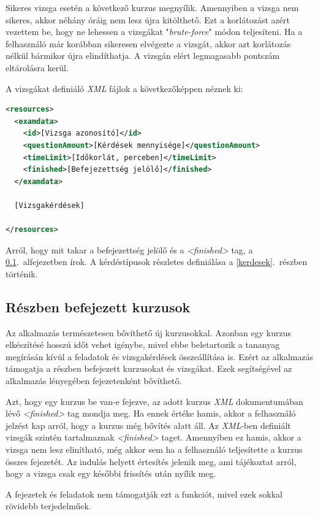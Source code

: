 \documentclass[12pt,a4paper]{article}
\newcommand{\xml}{\textit{XML}\xspace}
\begin{document}
	Sikeres vizsga esetén a következő kurzus megnyílik. Amennyiben a vizsga nem sikeres, akkor néhány óráig nem lesz újra kitölthető. Ezt a korlátozást azért vezettem be, hogy ne lehessen a vizsgákat "\textit{brute-force}" módon teljesíteni. Ha a felhasználó már korábban sikeresen elvégezte a vizsgát, akkor azt korlátozás nélkül bármikor újra elindíthatja. A vizsgán elért legmagasabb pontszám eltárolásra kerül.
	
	A vizsgákat definiáló \xml fájlok a következőképpen néznek ki:
	
	\bigskip
	\begin{lstlisting}[language=XML]
<resources>
  <examdata>
	<id>[Vizsga azonosító]</id>
	<questionAmount>[Kérdések mennyisége]</questionAmount>
	<timeLimit>[Időkorlát, perceben]</timeLimit>
    <finished>[Befejezettség jelölő]</finished>
  </examdata>
  
  [Vizsgakérdések]
  
</resources>
	\end{lstlisting}

	Arról, hogy mit takar a befejezettség jelölő és a \textit{<finished>} tag, a \ref{reszben_befejezett_kurzusok}.\ alfejezetben írok. A kérdéstípusok részletes definiálása a \ref{kerdesek}.\ részben történik.
	
	\subsection{Részben befejezett kurzusok}\label{reszben_befejezett_kurzusok}
	
	Az alkalmazás természetesen bővíthető új kurzusokkal. Azonban egy kurzus elkészítésé hosszú időt vehet igénybe, mivel ebbe beletartozik a tananyag megírásán kívül a feladatok és vizsgakérdések összeállítása is. Ezért az alkalmazás támogatja a részben befejezett kurzusokat és vizsgákat. Ezek segítségével az alkalmazás lényegében fejezetenként bővíthető.
	
	Azt, hogy egy kurzus be van-e fejezve, az adott kurzus \xml dokumentumában lévő \textit{<finished>} tag mondja meg. Ha ennek értéke hamis, akkor a felhasználó jelzést kap arról, hogy a kurzus még bővítés alatt áll. Az \xml-ben definiált vizsgák szintén tartalmaznak  \textit{<finished>} taget. Amennyiben ez hamis, akkor a vizsga nem lesz elinítható, még akkor sem ha a felhasználó teljesítette a kurzus összes fejezetét. Az indulás helyett értesítés jelenik meg, ami tájékoztat arról, hogy a vizsga csak egy későbbi frissítés után nyílik meg.
	
	A fejezetek és feladatok nem támogatják ezt a funkciót, mivel ezek sokkal rövidebb terjedelműek.
	
\end{document}
